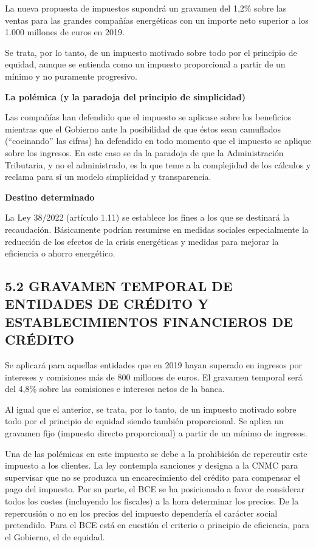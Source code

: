 \documentclass[
]{article}
\begin{document}
La nueva propuesta de impuestos supondrá un gravamen del 1,2\% sobre las
ventas para las grandes compañías energéticas con un importe neto
superior a los 1.000 millones de euros en 2019.

Se trata, por lo tanto, de un impuesto motivado sobre todo por el
principio de equidad, aunque se entienda como un impuesto proporcional a
partir de un mínimo y no puramente progresivo.

\textbf{La polémica (y la paradoja del principio de simplicidad)}

Las compañías han defendido que el impuesto se aplicase sobre los
beneficios mientras que el Gobierno ante la posibilidad de que éstos
sean camuflados (``cocinando'' las cifras) ha defendido en todo momento
que el impuesto se aplique sobre los ingresos. En este caso se da la
paradoja de que la Administración Tributaria, y no el administrado, es
la que teme a la complejidad de los cálculos y reclama para sí un modelo
simplicidad y transparencia.

\textbf{Destino determinado}

La Ley 38/2022 (artículo 1.11) se establece los fines a los que se
destinará la recaudación. Básicamente podrían resumirse en medidas
sociales especialmente la reducción de los efectos de la crisis
energéticas y medidas para mejorar la eficiencia o ahorro energético.

\hypertarget{gravamen-temporal-de-entidades-de-cruxe9dito-y-establecimientos-financieros-de-cruxe9dito}{%
\subsection*{5.2 GRAVAMEN TEMPORAL DE ENTIDADES DE CRÉDITO Y
ESTABLECIMIENTOS FINANCIEROS DE
CRÉDITO}\label{gravamen-temporal-de-entidades-de-cruxe9dito-y-establecimientos-financieros-de-cruxe9dito}}

Se aplicará para aquellas entidades que en 2019 hayan superado en
ingresos por intereses y comisiones más de 800 millones de euros. El
gravamen temporal será del 4,8\% sobre las comisiones e intereses netos
de la banca.

Al igual que el anterior, se trata, por lo tanto, de un impuesto
motivado sobre todo por el principio de equidad siendo también
proporcional. Se aplica un gravamen fijo (impuesto directo proporcional)
a partir de un mínimo de ingresos.

Una de las polémicas en este impuesto se debe a la prohibición de
repercutir este impuesto a los clientes. La ley contempla sanciones y
designa a la CNMC para supervisar que no se produzca un encarecimiento
del crédito para compensar el pago del impuesto. Por su parte, el BCE se
ha posicionado a favor de considerar todos los costes (incluyendo los
fiscales) a la hora determinar los precios. De la repercusión o no en
los precios del impuesto dependería el carácter social pretendido. Para
el BCE está en cuestión el criterio o principio de eficiencia, para el
Gobierno, el de equidad.
\end{document}
